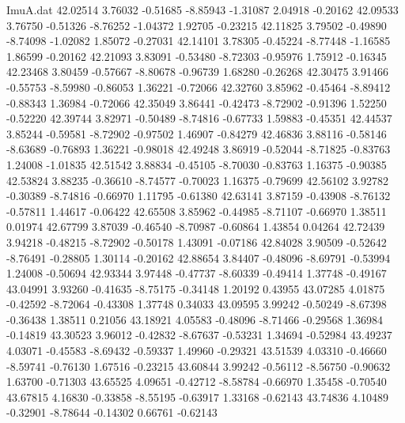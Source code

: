 \begin{filecontents}{ImuA.dat}
  42.02514    3.76032   -0.51685   -8.85943   -1.31087    2.04918   -0.20162
  42.09533    3.76750   -0.51326   -8.76252   -1.04372    1.92705   -0.23215
  42.11825    3.79502   -0.49890   -8.74098   -1.02082    1.85072   -0.27031
  42.14101    3.78305   -0.45224   -8.77448   -1.16585    1.86599   -0.20162
  42.21093    3.83091   -0.53480   -8.72303   -0.95976    1.75912   -0.16345
  42.23468    3.80459   -0.57667   -8.80678   -0.96739    1.68280   -0.26268
  42.30475    3.91466   -0.55753   -8.59980   -0.86053    1.36221   -0.72066
  42.32760    3.85962   -0.45464   -8.89412   -0.88343    1.36984   -0.72066
  42.35049    3.86441   -0.42473   -8.72902   -0.91396    1.52250   -0.52220
  42.39744    3.82971   -0.50489   -8.74816   -0.67733    1.59883   -0.45351
  42.44537    3.85244   -0.59581   -8.72902   -0.97502    1.46907   -0.84279
  42.46836    3.88116   -0.58146   -8.63689   -0.76893    1.36221   -0.98018
  42.49248    3.86919   -0.52044   -8.71825   -0.83763    1.24008   -1.01835
  42.51542    3.88834   -0.45105   -8.70030   -0.83763    1.16375   -0.90385
  42.53824    3.88235   -0.36610   -8.74577   -0.70023    1.16375   -0.79699
  42.56102    3.92782   -0.30389   -8.74816   -0.66970    1.11795   -0.61380
  42.63141    3.87159   -0.43908   -8.76132   -0.57811    1.44617   -0.06422
  42.65508    3.85962   -0.44985   -8.71107   -0.66970    1.38511    0.01974
  42.67799    3.87039   -0.46540   -8.70987   -0.60864    1.43854    0.04264
  42.72439    3.94218   -0.48215   -8.72902   -0.50178    1.43091   -0.07186
  42.84028    3.90509   -0.52642   -8.76491   -0.28805    1.30114   -0.20162
  42.88654    3.84407   -0.48096   -8.69791   -0.53994    1.24008   -0.50694
  42.93344    3.97448   -0.47737   -8.60339   -0.49414    1.37748   -0.49167
  43.04991    3.93260   -0.41635   -8.75175   -0.34148    1.20192    0.43955
  43.07285    4.01875   -0.42592   -8.72064   -0.43308    1.37748    0.34033
  43.09595    3.99242   -0.50249   -8.67398   -0.36438    1.38511    0.21056
  43.18921    4.05583   -0.48096   -8.71466   -0.29568    1.36984   -0.14819
  43.30523    3.96012   -0.42832   -8.67637   -0.53231    1.34694   -0.52984
  43.49237    4.03071   -0.45583   -8.69432   -0.59337    1.49960   -0.29321
  43.51539    4.03310   -0.46660   -8.59741   -0.76130    1.67516   -0.23215
  43.60844    3.99242   -0.56112   -8.56750   -0.90632    1.63700   -0.71303
  43.65525    4.09651   -0.42712   -8.58784   -0.66970    1.35458   -0.70540
  43.67815    4.16830   -0.33858   -8.55195   -0.63917    1.33168   -0.62143
  43.74836    4.10489   -0.32901   -8.78644   -0.14302    0.66761   -0.62143

\end{filecontents}
